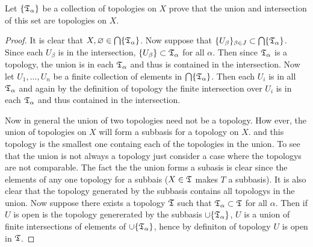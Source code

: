 \question 
Let $\{\mathfrak{T}_\alpha\}$ be a collection of topologies on $X$ prove that the union and intersection of this set are topologies on $X$. 


\begin{proof}
    It is clear that $X, \varnothing \in \bigcap \{\mathfrak{T}_\alpha\}$. Now suppose that $\{U_\beta\}_{\beta \in J} \subset \bigcap \{\mathfrak{T}_\alpha\}$. 
    Since each $U_\beta$ is in the intersection, $\{U_\beta\} \subset \mathfrak{T}_\alpha$ for all $\alpha$. Then since $\mathfrak{T}_\alpha$ is a topology, 
    the union is in each $\mathfrak{T}_\alpha$ and thus is contained in the intersection. Now let $U_1, ..., U_n$ be a finite collection of elements in 
    $\bigcap \{\mathfrak{T}_\alpha\}$. Then each $U_i$ is in all $\mathfrak{T}_\alpha$ and again by the definition of topology the finite intersection over $U_i$ is in each 
    $\mathfrak{T}_\alpha$ and thus contained in the intersection. 

    Now in general the union of two topologies need not be a topology. How ever, the union of topologies on $X$ will form a subbasis for a topology on $X$. 
    and this topology is the smallest one containg each of the topologies in the union. To see that the union is not always a topology just consider a case where 
    the topologys are not comparable. The fact the the union forms a subasis is clear since the elements of any one topology for a subbais ($X \in \mathfrak{T}$ makes $T$ a subbasis). 
    It is also clear that the topology generated by the subbasis contains all topologys in the union. Now suppose there exists a topology $\mathfrak{T}$ such that $\mathfrak{T}_\alpha \subset \mathfrak{T}$ for all $\alpha$. 
    Then if $U$ is open is the topology genererated by the subbasis $\cup \{\mathfrak{T}_\alpha\}$, $U$ is a union of finite intersections of elements of $\cup \{\mathfrak{T}_\alpha\}$, hence 
    by definiton of topology $U$ is open in $\mathfrak{T}$. 
     
\end{proof}
    

